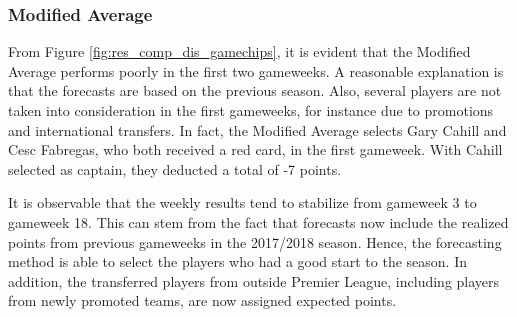  

\subsubsection{Modified Average}

From Figure \ref{fig:res_comp_dis_gamechips}, it is evident that the Modified Average performs poorly in the first two gameweeks. A reasonable explanation is that the forecasts are based on the previous season. Also, several players are not taken into consideration in the first gameweeks, for instance due to promotions and international transfers. In fact, the Modified Average selects Gary Cahill and Cesc Fabregas, who both received a red card, in the first gameweek. With Cahill selected as captain, they deducted a total of -7 points.

\newpar

It is observable that the weekly results tend to stabilize from gameweek 3 to gameweek 18. This can stem from the fact that forecasts now include the realized points from previous gameweeks in the 2017/2018 season. Hence, the forecasting method is able to select the players who had a good start to the season. In addition, the transferred players from outside Premier League, including players from newly promoted teams, are now assigned expected points.

